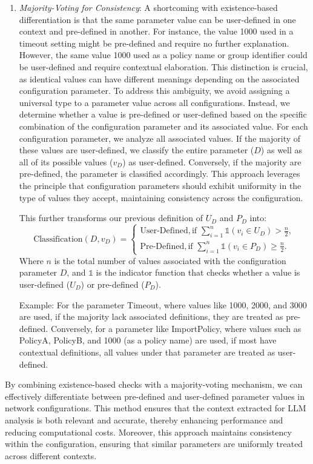 \begin{enumerate}
\item \textit{Majority-Voting for Consistency}: A shortcoming with existence-based differentiation is that the same parameter value can be user-defined in one context and pre-defined in another. For instance, the value 1000 used in a timeout setting might be pre-defined and require no further explanation. However, the same value 1000 used as a policy name or group identifier could be user-defined and require contextual elaboration. This distinction is crucial, as identical values can have different meanings depending on the associated configuration parameter. To address this ambiguity, we avoid assigning a universal type to a parameter value across all configurations. Instead, we determine whether a value is pre-defined or user-defined based on the specific combination of the configuration parameter and its associated value. For each configuration parameter, we analyze all associated values. If the majority of these values are user-defined, we classify the entire parameter (\(D\)) as well as all of its possible values (\(v_D\)) as user-defined. Conversely, if the majority are pre-defined, the parameter is classified accordingly. This approach leverages the principle that configuration parameters should exhibit uniformity in the type of values they accept, maintaining consistency across the configuration.

This further transforms our previous definition of \(U_D\) and \(P_D\) into:
\[
\text{Classification}(D, v_D) = 
\begin{cases} 
\text{User-Defined}, \text{if } \sum_{i=1}^{n} \mathbb{1}(v_i \in U_D) > \frac{n}{2}, \\
\text{Pre-Defined}, \text{if } \sum_{i=1}^{n} \mathbb{1}(v_i \in P_D) \geq \frac{n}{2}.
\end{cases}
\]
Where \( n \) is the total number of values associated with the configuration parameter \( D \), and \( \mathbb{1} \) is the indicator function that checks whether a value is user-defined (\( U_D \)) or pre-defined (\( P_D \)).


Example: For the parameter Timeout, where values like 1000, 2000, and 3000 are used, if the majority lack associated definitions, they are treated as pre-defined. Conversely, for a parameter like ImportPolicy, where values such as PolicyA, PolicyB, and 1000 (as a policy name) are used, if most have contextual definitions, all values under that parameter are treated as user-defined.
\end{enumerate}

By combining existence-based checks with a majority-voting mechanism, we can effectively differentiate between pre-defined and user-defined parameter values in network configurations. This method ensures that the context extracted for LLM analysis is both relevant and accurate, thereby enhancing performance and reducing computational costs. Moreover, this approach maintains consistency within the configuration, ensuring that similar parameters are uniformly treated across different contexts.


